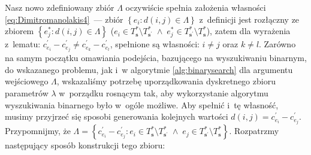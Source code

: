 Nasz nowo zdefiniowany zbiór $\Lambda$ oczywiście spełnia założenia własności \ref{eq:Dimitromanolakis4}~--- zbiór $\left\{ e_{i} : d \left( i, j \right) \in \Lambda \right\}$ z~definicji jest rozłączny ze zbiorem $\left\{ e^{\ast}_{j} : d \left( i, j \right) \in \Lambda \right\}$ ($e_{i} \in T^{\ast}_{\textbf{s}} \setminus T^{\ast}_{\textbf{s}^{\prime}} \; \wedge \; e^{\ast}_{j} \in T^{\ast}_{\textbf{s}^{\prime}} \setminus T^{\ast}_{\textbf{s}}$), zatem dla wyrażenia z~lematu: $c^{\prime}_{e_{i}} - c^{\prime}_{e_{j}} \neq c^{\prime}_{e_{k}} - c^{\prime}_{e_{l}}$, spełnione są własności: $i \neq j$ oraz $k \neq l$.
Zarówno na samym początku omawiania podejścia, bazującego na wyszukiwaniu binarnym, do wskazanego problemu, jak i~w algorytmie \ref{alg:binarysearch} dla argumentu wejściowego $\Lambda$, wskazaliśmy potrzebę uporządkowania dyskretnego zbioru parametrów $\lambda$ w~porządku rosnącym tak, aby wykorzystanie algorytmu wyszukiwania binarnego było w~ogóle możliwe.
Aby spełnić i~tę własność, musimy przyjrzeć się sposobi generowania kolejnych wartości $d \left( i, j \right) = c^{\prime}_{e_{i}} - c^{\prime}_{e_{j}}$.
Przypomnijmy, że $\Lambda = \left\{ c^{\prime}_{e_{i}} - c^{\prime}_{e_{j}} : e_{i} \in T^{\ast}_{\textbf{s}} \setminus T^{\ast}_{\textbf{s}^{\prime}} \; \wedge \; e_{j} \in T^{\ast}_{\textbf{s}^{\prime}} \setminus T^{\ast}_{\textbf{s}} \right\}$. 
Rozpatrzmy następujący sposób konstrukcji tego zbioru:

